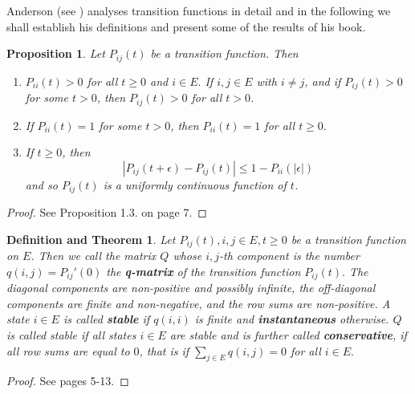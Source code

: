 \documentclass[12pt,a4paper]{scrartcl}
\newtheorem{proposition}[theorem]{Proposition}
\newtheorem{definitionandtheorem}[theorem]{Definition and Theorem}
\numberwithin{equation}{section}
\begin{document}
Anderson (see \cite{anderson}) analyses transition functions in detail and in the following we shall establish his definitions and present some of the results of his book. 

\begin{proposition} \label{th:transfcont}
Let $P_{ij}\left(t\right)$ be a transition function. Then
\begin{enumerate}[(1)]
\item $P_{ii}\left(t\right) > 0 $ for all $t \geq 0$ and $i \in E.$ If $i,j \in E$ with $i \neq j$, and if $P_{ij}\left(t\right) > 0$ for some $t >0$, then $P_{ij}\left(t\right) > 0$ for all $t > 0$.
\item If $P_{ii}\left(t\right) = 1$ for some $t >0$, then $P_{ii}\left(t\right) = 1$ for all $t\geq 0.$
\item If $t \geq 0$, then
$$ \left|P_{ij}\left(t+\epsilon \right) - P_{ij}\left(t\right) \right| \leq  1 - P_{ii}\left(\left|\epsilon\right| \right)$$
and so $P_{ij}\left(t\right)$ is a uniformly continuous function of $t$.
\end{enumerate}
\end{proposition}
\begin{proof}
See \cite{anderson} Proposition 1.3. on page 7.
\end{proof}

\begin{definitionandtheorem} \label{th:defqmatrixoftransitionfunction}
Let $P_{ij}\left(t\right), i,j \in E, t\geq 0$ be a transition function on $E$. Then we call the matrix $Q$ whose $i,j$-th component is the number $q\left(i,j\right) = P_{ij}'\left(0\right)$ the \textbf{q-matrix} of the transition function $P_{ij}\left(t\right).$ The diagonal components are non-positive and possibly infinite, the off-diagonal components are finite and non-negative, and the row sums are non-positive. A state $i \in E$ is called \textbf{stable} if $q\left(i,i\right)$ is finite and \textbf{instantaneous} otherwise. $Q$ is called stable if all states $i \in E$ are stable and is further called \textbf{conservative}, if all row sums are equal to $0$, that is if $\sum_{j \in E} q\left(i,j\right) = 0$ for all $i \in E.$
\end{definitionandtheorem}
\begin{proof}
See \cite{anderson} pages 5-13.
\end{proof}
\end{document}
